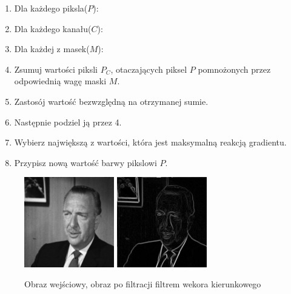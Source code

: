 \documentclass[final,a4paper,openany,12pt]{mwbk}
\begin{document}
\begin{enumerate}
	\item Dla każdego piksla($P$):
	\item Dla każdego kanału($C$):
	\item Dla każdej z masek($M$):
	\item Zsumuj wartości piksli $P_C$, otaczających piksel $P$ pomnożonych przez odpowiednią wagę maski $M$.
	\item Zastosój wartość bezwzględną na otrzymanej sumie.
	\item Następnie podziel ją przez 4.
	\item Wybierz największą z wartości, która jest maksymalną reakcją gradientu.
	\item Przypisz nową wartość barwy pikslowi $P$.
\end{enumerate}

\begin{figure}[H]
	\begin{center}
		\includegraphics[width=0.35\textwidth]{gentelman_gray}
		\includegraphics[width=0.35\textwidth]{gentelman_gray_vdgPrewitt_result}
	\end{center}
	\caption{Obraz wejściowy, obraz po filtracji filtrem wekora kierunkowego}
\end{figure}
\end{document}
